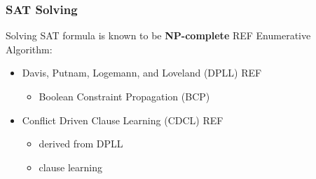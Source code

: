 \documentclass{beamer}
\begin{document}
\begin{frame}
\frametitle{SAT Solving}

	Solving SAT formula is known to be \textbf{NP-complete} REF
	\vfill
	Enumerative Algorithm:
	\begin{itemize}
		\item Davis, Putnam, Logemann, and Loveland (DPLL) REF
		\begin{itemize}
			\item Boolean Constraint Propagation (BCP)
		\end{itemize}
		\item Conflict Driven Clause Learning (CDCL) REF
		\begin{itemize}
			\item derived from DPLL
			\item clause learning
		\end{itemize}
	\end{itemize}
	
\end{frame}
\end{document}
